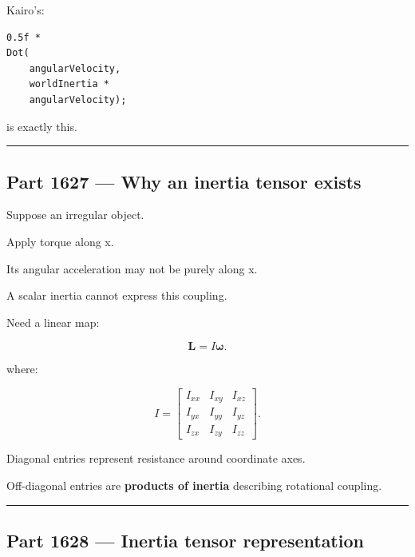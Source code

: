 Kairo's:

\begin{verbatim}
0.5f *
Dot(
    angularVelocity,
    worldInertia *
    angularVelocity);
\end{verbatim}

is exactly this.

\begin{center}\rule{0.5\linewidth}{0.5pt}\end{center}

\subsection{Part 1627 --- Why an inertia tensor exists}\label{06-engine-ii-ch035-part-1627-why-an-inertia-tensor-exists}

\hypertarget{06-engine-ii-ch035-part-1627-why-an-inertia-tensor-exists}{}

Suppose an irregular object.

Apply torque along x.

Its angular acceleration may not be purely along x.

A scalar inertia cannot express this coupling.

Need a linear map:

\[
\boxed{
\mathbf{L}
=
I\boldsymbol{\omega}.
}
\]

where:

\[
I=
\begin{bmatrix}
I_{xx}&I_{xy}&I_{xz}\\
I_{yx}&I_{yy}&I_{yz}\\
I_{zx}&I_{zy}&I_{zz}
\end{bmatrix}.
\]

Diagonal entries represent resistance around coordinate axes.

Off-diagonal entries are \textbf{products of inertia} describing rotational coupling.

\begin{center}\rule{0.5\linewidth}{0.5pt}\end{center}

\subsection{Part 1628 --- Inertia tensor representation}\label{06-engine-ii-ch035-part-1628-inertia-tensor-representation}

\hypertarget{06-engine-ii-ch035-part-1628-inertia-tensor-representation}{}

